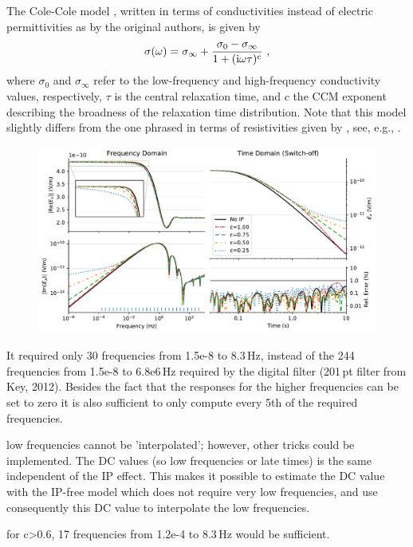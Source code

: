 \documentclass[extra, camera,%
    onecolumn,   %
    referee,     %
]{gji}
\newlength{\fwidth}
\begin{document}
The Cole-Cole model \citep[CCM, ][]{JCP.41.Cole}, written in terms of
conductivities instead of electric permittivities as by the original authors,
is given by
%
\begin{equation}
  \sigma(\omega) = \sigma_\infty + \frac{\sigma_0 - \sigma_\infty}{1 +
    (\rm{i}\omega\tau)^c}\ ,
  \label{eq:ccm}
\end{equation}
%
where $\sigma_0$ and $\sigma_\infty$ refer to the low-frequency and
high-frequency conductivity values, respectively, $\tau$ is the central
relaxation time, and $c$ the CCM exponent describing the broadness of the
relaxation time distribution. Note that this model slightly differs from the
one phrased in terms of resistivities given by \cite{GEO.78.Pelton}, see, e.g.,
\cite{GJI.13.Tarasov}.
%
\begin{figure}
  \centering
  \includegraphics[width=\fwidth]{11-cole-cole-model}
  \caption{}
  \label{fig:CCM}
\end{figure}
%

It required only 30 frequencies from 1.5e-8 to 8.3\,Hz, instead of the 244
frequencies from 1.5e-8 to 6.8e6\,Hz required by the digital filter (201\,pt
filter from Key, 2012). Besides the fact that the responses for the higher
frequencies can be set to zero it is also sufficient to only compute every
5th of the required frequencies.

low frequencies cannot be 'interpolated'; however, other tricks could be
implemented. The DC values (so low frequencies or late times) is the same
independent of the IP effect. This makes it possible to estimate the DC value
with the IP-free model which does not require very low frequencies, and use
consequently this DC value to interpolate the low frequencies.

for c>0.6, 17 frequencies from 1.2e-4 to 8.3\,Hz would be sufficient.
\end{document}
